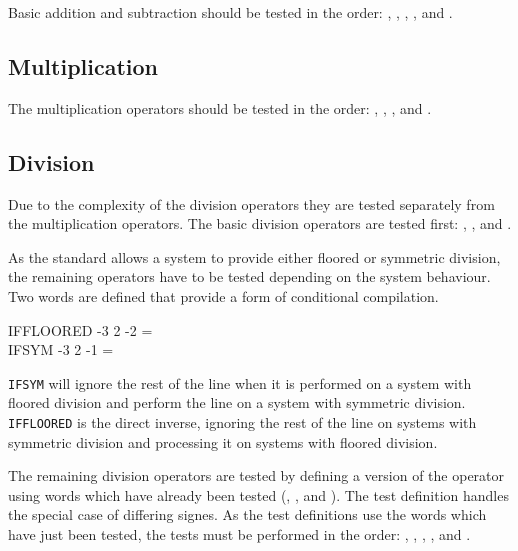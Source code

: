 Basic addition and subtraction should be tested in the order:
	,
	,
	,
	,
	 and
	.

\subsection{Multiplication}

The multiplication operators should be tested in the order:
	,
	,
	, and
	.

\subsection{Division}

Due to the complexity of the division operators they are tested
separately from the multiplication operators.  The basic division
operators are tested first:
	,
	, and
	.

As the standard allows a system to provide either floored or symmetric
division, the remaining operators have to be tested depending on the
system behaviour.  Two words are defined that provide a form of
conditional compilation.

\begin{tt}
\word{:} IFFLOORED 
	\word{[} -3 2 \word{/} -2 =  \word{]}
	    
\word{;} \\
\word{:} IFSYM \tab[1.8]
	\word{[} -3 2 \word{/} -1 =  \word{]}
	    
\word{;}
\end{tt}

\texttt{IFSYM} will ignore the rest of the line when it is performed
on a system with floored division and perform the line on a system
with symmetric division.  \texttt{IFFLOORED} is the direct inverse,
ignoring the rest of the line on systems with symmetric division and
processing it on systems with floored division.

The remaining division operators are tested by defining a version of
the operator using words which have already been tested (,
,  and ).  The test definition
handles the special case of differing signes.  As the test definitions
use the words which have just been tested, the tests must be performed
in the order:
	,
	,
	,
	, and
	.


